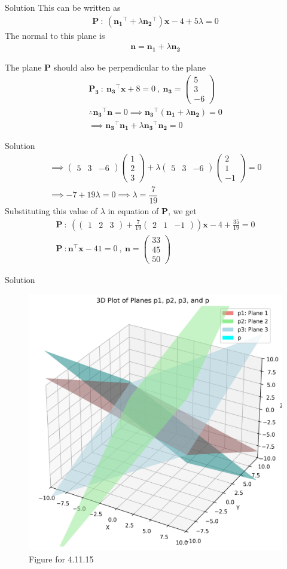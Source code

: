 \documentclass{beamer}
\let\vec\mathbf
\providecommand{\brak}[1]{\ensuremath{\left(#1\right)}}
\theoremstyle{remark}
\newcommand{\myvec}[1]{\ensuremath{\begin{pmatrix}#1\end{pmatrix}}}
\begin{document}
\begin{frame}{Solution}
This can be written as 
\begin{align}
    \vec{P} \ : \ \brak{\vec{n_1}^{\top}+ \lambda\vec{n_2}^{\top}}\vec{x} -4 + 5\lambda=0
\end{align}
The normal to this plane is 
\begin{align}
    \vec{n}=\vec{n_1} + \lambda\vec{n_2}
\end{align}

The plane $\vec{P}$ should also be perpendicular to the plane 
\begin{align}
    \vec{P_3} \ : \ \vec{n_3}^{\top} \vec{x}+8=0 \ , \ \vec{n_3}=\myvec{5 \\ 3 \\ -6} \\
    \therefore \vec{n_3}^{\top} \vec{n}=0 \implies \vec{n_3}^{\top}\brak{\vec{n_1} + \lambda\vec{n_2}}=0 \\
    \implies \vec{n_3}^{\top}\vec{n_1} + \lambda\vec{n_3}^{\top}\vec{n_2}=0
\end{align}
\end{frame}
\begin{frame}{Solution}
    \begin{align}
        \implies \myvec{5 & 3 & -6}\myvec{1 \\ 2 \\ 3 }  +  \lambda\myvec{5 & 3 & -6}\myvec{2 \\ 1 \\ -1 }=0 \\
    \implies -7 +19\lambda=0 \implies \lambda = \dfrac{7}{19}
    \end{align}
    Substituting this value of $\lambda$ in equation of $\vec{P}$, we get
\begin{align}
    \vec{P}\ :\ \brak{\myvec{1 & 2 & 3 } + \frac{7}{19}\myvec{2 & 1 & -1 }}\vec{x} -4 + \frac{35}{19}=0\\
    \vec{P} \ : \vec{n}^{\top}\vec{x}-41=0 \ , \ \vec{n}=\myvec{33 \\ 45 \\ 50}
\end{align}
\end{frame}
\begin{frame}{Solution}
\begin{figure}[H]
    \centering
    \includegraphics[width=0.5\columnwidth]{figs/1.png}
    \caption{Figure for 4.11.15}
    \label{fig:placeholder}
\end{figure}
\end{frame}
\end{document}
